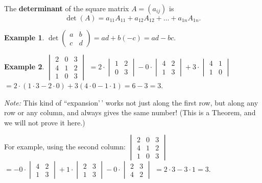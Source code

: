 \documentclass[
  english,
  12pt,
  oneside]{book}
\theoremstyle{definition}
\theoremstyle{definition}
\newtheorem{example}{Example}[chapter]
\theoremstyle{definition}
\theoremstyle{definition}
\theoremstyle{remark}
\begin{document}
The \textbf{determinant} of the square matrix \(A=(a_{ij})\) is
\[\det(A) = a_{11}A_{11} + a_{12}A_{12} + \dots + a_{1n}A_{1n}.\]

\begin{example}
\protect\hypertarget{exm:unnamed-chunk-53}{}\label{exm:unnamed-chunk-53}\(\det\begin{pmatrix}a&b\\c&d\end{pmatrix} = ad + b(-c)=ad-bc\).
\end{example}

\begin{example}
\protect\hypertarget{exm:unnamed-chunk-54}{}\label{exm:unnamed-chunk-54}\(\begin{vmatrix}2&0&3\\4&1&2\\1&0&3\end{vmatrix}\)
\(=2\cdot\begin{vmatrix}1&2\\0&3\end{vmatrix} - 0\cdot\begin{vmatrix}4&2\\1&3\end{vmatrix} + 3\cdot\begin{vmatrix}4&1\\1&0\end{vmatrix}\)
\(=2\cdot(1\cdot3-2\cdot0) + 3(4\cdot0-1\cdot1)=6-3=3\).
\end{example}

\emph{Note:} This kind of ``expansion'\,' works not just along the first row, but along any row or any column, and always gives the same number! (This is a Theorem, and we will not prove it here.)

For example, using the second column:
\(\begin{vmatrix}2&0&3\\4&1&2\\1&0&3\end{vmatrix}\)
\(=-0\cdot\begin{vmatrix}4&2\\1&3\end{vmatrix} + 1\cdot\begin{vmatrix}2&3\\1&3\end{vmatrix} - 0\cdot\begin{vmatrix}2&3\\4&2\end{vmatrix}\)
\(=2\cdot3-3\cdot1=3\).
\end{document}

